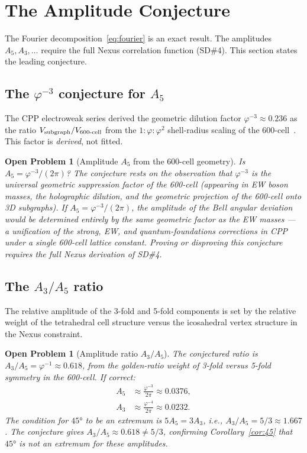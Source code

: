\documentclass[11pt,a4paper]{article}
\newtheorem{openprob}[theorem]{Open Problem}
\newcommand{\phig}{\varphi}
\begin{document}
\section{The Amplitude Conjecture}
\label{sec:conjecture}

The Fourier decomposition~\eqref{eq:fourier} is an exact result.
The amplitudes $A_5, A_3, \ldots$ require the full Nexus correlation
function (SD\#4).  This section states the leading conjecture.

\subsection{The $\phig^{-3}$ conjecture for $A_5$}

The CPP electroweak series derived the geometric dilution factor
$\phig^{-3} \approx 0.236$ as the ratio $V_{\rm subgraph}/V_{\rm
600\text{-}cell}$ from the $1:\phig:\phig^2$ shell-radius scaling of
the 600-cell~\citep{cpp_ew_unified}.  This factor is \emph{derived},
not fitted.

\begin{openprob}[Amplitude $A_5$ from the 600-cell geometry]
\label{op:A5}
Is $A_5 = \phig^{-3}/(2\pi)$?  The conjecture rests on the
observation that $\phig^{-3}$ is the universal geometric suppression
factor of the 600-cell (appearing in EW boson masses, the
holographic dilution, and the geometric projection of the 600-cell
onto 3D subgraphs).  If $A_5 = \phig^{-3}/(2\pi)$, the amplitude of
the Bell angular deviation would be determined entirely by the same
geometric factor as the EW masses --- a unification of the strong,
EW, and quantum-foundations corrections in CPP under a single
600-cell lattice constant.  Proving or disproving this conjecture
requires the full Nexus derivation of SD\#4.
\end{openprob}

\subsection{The $A_3/A_5$ ratio}

The relative amplitude of the 3-fold and 5-fold components is set by
the relative weight of the tetrahedral cell structure versus the
icosahedral vertex structure in the Nexus constraint.

\begin{openprob}[Amplitude ratio $A_3/A_5$]
\label{op:ratio}
The conjectured ratio is $A_3/A_5 = \phig^{-1} \approx 0.618$,
from the golden-ratio weight of 3-fold versus 5-fold symmetry in the
600-cell.  If correct:
\begin{align}
A_5 &\approx \frac{\phig^{-3}}{2\pi} \approx 0.0376, \label{eq:A5} \\
A_3 &\approx \frac{\phig^{-4}}{2\pi} \approx 0.0232. \label{eq:A3}
\end{align}
The condition for $45°$ to be an extremum is $5A_5 = 3A_3$, i.e.,
$A_3/A_5 = 5/3 \approx 1.667$.  The conjecture gives
$A_3/A_5 \approx 0.618 \neq 5/3$, confirming Corollary~\ref{cor:45}
that $45°$ is not an extremum for these amplitudes.
\end{openprob}
\end{document}
